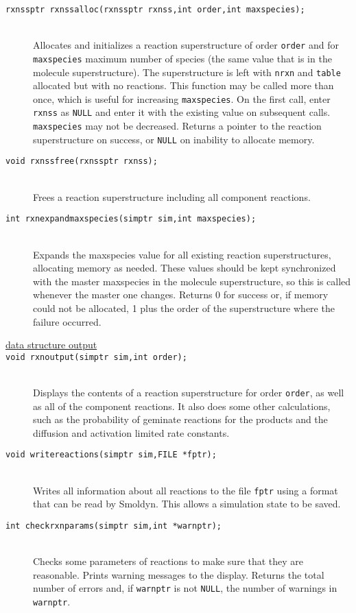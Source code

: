 \documentclass {scrbook}
\newcommand {\ttt} {\texttt}
\begin{document}
\begin{description}
\item[\ttt{rxnssptr rxnssalloc(rxnssptr rxnss,int order,int maxspecies);}]
\hfill \\
Allocates and initializes a reaction superstructure of order \ttt{order} and for \ttt{maxspecies} maximum number of species (the same value that is in the molecule superstructure). The superstructure is left with \ttt{nrxn} and \ttt{table} allocated but with no reactions. This function may be called more than once, which is useful for increasing \ttt{maxspecies}. On the first call, enter \ttt{rxnss} as \ttt{NULL} and enter it with the existing value on subsequent calls. \ttt{maxspecies} may not be decreased. Returns a pointer to the reaction superstructure on success, or \ttt{NULL} on inability to allocate memory.

\item[\ttt{void rxnssfree(rxnssptr rxnss);}]
\hfill \\
Frees a reaction superstructure including all component reactions.

\item[\ttt{int rxnexpandmaxspecies(simptr sim,int maxspecies);}]
\hfill \\
Expands the maxspecies value for all existing reaction superstructures, allocating memory as needed. These values should be kept synchronized with the master maxspecies in the molecule superstructure, so this is called whenever the master one changes. Returns 0 for success or, if memory could not be allocated, 1 plus the order of the superstructure where the failure occurred.

\item[\underline{data structure output}]

\item[\ttt{void rxnoutput(simptr sim,int order);}]
\hfill \\
Displays the contents of a reaction superstructure for order \ttt{order}, as well as all of the component reactions. It also does some other calculations, such as the probability of geminate reactions for the products and the diffusion and activation limited rate constants.

\item[\ttt{void writereactions(simptr sim,FILE *fptr);}]
\hfill \\
Writes all information about all reactions to the file \ttt{fptr} using a format that can be read by Smoldyn. This allows a simulation state to be saved.

\item[\ttt{int checkrxnparams(simptr sim,int *warnptr);}]
\hfill \\
Checks some parameters of reactions to make sure that they are reasonable. Prints warning messages to the display. Returns the total number of errors and, if \ttt{warnptr} is not \ttt{NULL}, the number of warnings in \ttt{warnptr}.


\end{description}
\end{document}
